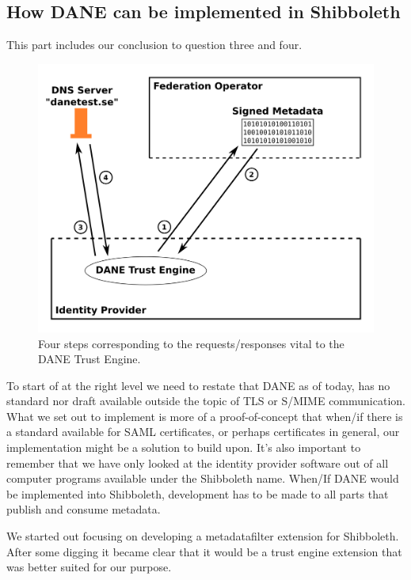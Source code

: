 \subsection{How DANE can be implemented in Shibboleth}
This part includes our conclusion to question three and four.

\begin{figure}[ht]
\begin{center}
\includegraphics[scale=1]{Figures/dane-impl.png}
\end{center}
\caption{Four steps corresponding to the requests/responses vital to the DANE Trust Engine.
\label{ch5:dane-impl}}
\end{figure}


To start of at the right level we need to restate that DANE as of today, has no standard nor draft available outside the topic of TLS or S/MIME communication.
What we set out to implement is more of a proof-of-concept that when/if there is a standard available for SAML certificates, or perhaps certificates in general, our implementation might be a solution to build upon.
It's also important to remember that we have only looked at the identity provider software out of all computer programs available under the Shibboleth name.
When/If DANE would be implemented into Shibboleth, development has to be made to all parts that publish and consume metadata.

We started out focusing on developing a metadatafilter extension for Shibboleth.
After some digging it became clear that it would be a trust engine extension that was better suited for our purpose.

